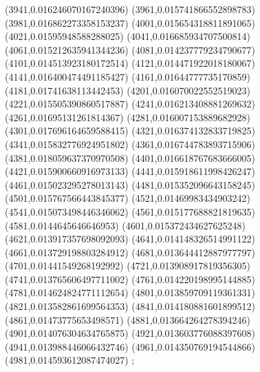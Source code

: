 {(3941,0.016246070167240396)
(3961,0.015741866552898783)
(3981,0.016862273358153237)
(4001,0.015654318811891065)
(4021,0.01595948588288025)
(4041,0.016685934707500814)
(4061,0.015212635941344236)
(4081,0.014237779234790677)
(4101,0.014513923180172514)
(4121,0.014471922018180067)
(4141,0.016400474491185427)
(4161,0.01644777735170859)
(4181,0.01741638113442453)
(4201,0.016070022552519023)
(4221,0.015505390860517887)
(4241,0.016213408881269632)
(4261,0.01695131261814367)
(4281,0.016007153889682928)
(4301,0.017696164659588415)
(4321,0.016374132833719825)
(4341,0.015832776924951802)
(4361,0.016744783893715906)
(4381,0.018059637370970508)
(4401,0.016618767683666005)
(4421,0.015900660916973133)
(4441,0.015918611998426247)
(4461,0.015023295278013143)
(4481,0.015352096643158245)
(4501,0.015767566443845377)
(4521,0.01469983434903242)
(4541,0.015073498446346062)
(4561,0.015177688821819635)
(4581,0.0144645646646953)
(4601,0.015372434627625248)
(4621,0.013917357698092093)
(4641,0.014148326514991122)
(4661,0.013729198803284912)
(4681,0.013644412887977797)
(4701,0.01441549268192992)
(4721,0.013908917819356305)
(4741,0.013765606497711002)
(4761,0.014220198995144885)
(4781,0.014624824771112654)
(4801,0.013859709119361331)
(4821,0.013582861699564353)
(4841,0.014180881601899512)
(4861,0.01473775653498571)
(4881,0.013664264278394246)
(4901,0.014076304634765875)
(4921,0.013603776088397608)
(4941,0.013988446066432746)
(4961,0.014350769194544866)
(4981,0.014593612087474027)
};
